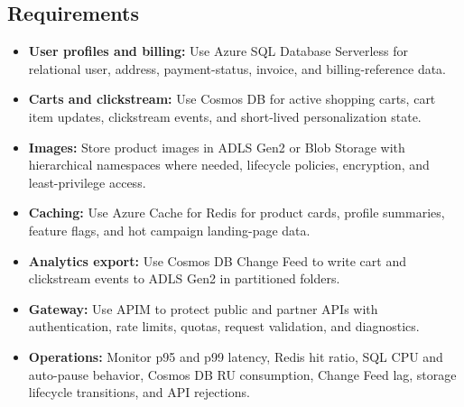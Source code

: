 \subsection*{Requirements}
\begin{itemize}
    \item \textbf{User profiles and billing:} Use Azure SQL Database Serverless for relational user, address, payment-status, invoice, and billing-reference data.
    \item \textbf{Carts and clickstream:} Use Cosmos DB for active shopping carts, cart item updates, clickstream events, and short-lived personalization state.
    \item \textbf{Images:} Store product images in ADLS Gen2 or Blob Storage with hierarchical namespaces where needed, lifecycle policies, encryption, and least-privilege access.
    \item \textbf{Caching:} Use Azure Cache for Redis for product cards, profile summaries, feature flags, and hot campaign landing-page data.
    \item \textbf{Analytics export:} Use Cosmos DB Change Feed to write cart and clickstream events to ADLS Gen2 in partitioned folders.
    \item \textbf{Gateway:} Use APIM to protect public and partner APIs with authentication, rate limits, quotas, request validation, and diagnostics.
    \item \textbf{Operations:} Monitor p95 and p99 latency, Redis hit ratio, SQL CPU and auto-pause behavior, Cosmos DB RU consumption, Change Feed lag, storage lifecycle transitions, and API rejections.
\end{itemize}

